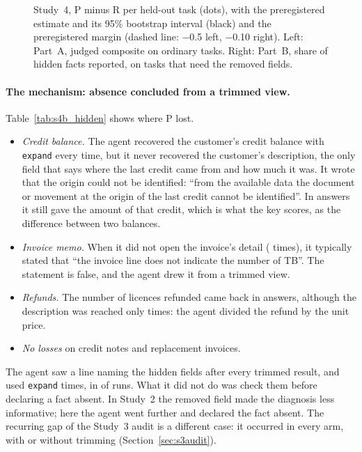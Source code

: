 \begin{figure}[t]
\centering

\caption{Study~4, P minus R per held-out task (dots), with the preregistered estimate and its 95\% bootstrap interval
(black) and the preregistered margin (dashed line: $-$0.5 left, $-$0.10 right). Left: Part~A, judged composite on ordinary tasks. Right: Part~B, share of hidden
facts reported, on tasks that need the removed fields.}
\label{fig:quality}
\end{figure}

\begin{table}[t]
\centering\small

\caption{Study~4B: each kind of hidden fact, reported correctly in R and in P, and whether its value reached the
model in P, through \texttt{expand} or an untrimmed detail call (a run can use both). $^{\ddagger}$The preregistered
check confuses the replacement link with an invoice line's field of the same name, so it is not reported for that
fact (a deviation; the facts reported are scored independently).}
\label{tab:s4b_hidden}
\end{table}

\paragraph{The mechanism: absence concluded from a trimmed view.} Table~\ref{tab:s4b_hidden} shows where P lost.
\begin{itemize}
\item \emph{Credit balance.} The agent recovered the customer's credit balance with \texttt{expand} every time,
but it never recovered the customer's description, the only field that says where the last credit came from and
how much it was. It wrote that the origin could not be identified: ``from the available data the document or
movement at the origin of the last credit cannot be identified''. In \SfourBOriginP{} answers it still gave the
amount of that credit, which is what the key scores, as the difference between two balances.
\item \emph{Invoice memo.} When it did not open the invoice's detail (\SfourBMemoMissed{} times), it typically
stated that
``the invoice line does not indicate the number of TB''. The statement is false, and the agent drew it from a
trimmed view.
\item \emph{Refunds.} The number of licences refunded came back in \SfourBRefundP{} answers, although the
description was reached only \SfourBRefundReached{} times: the agent divided the refund by the unit price.
\item \emph{No losses} on credit notes and replacement invoices.
\end{itemize}
The agent saw a line naming the hidden fields after every trimmed result, and used \texttt{expand}
\SfourBExpand{} times, in \SfourBExpandRuns{} of \SfourBRunsPerArm{} runs. What it did not do was check them before
declaring a fact absent. In Study~2 the removed field made the diagnosis less informative; here the agent went
further and declared the fact absent. The recurring gap of the Study~3 audit is a different case: it occurred in
every arm, with or without trimming (Section~\ref{sec:s3audit}).

